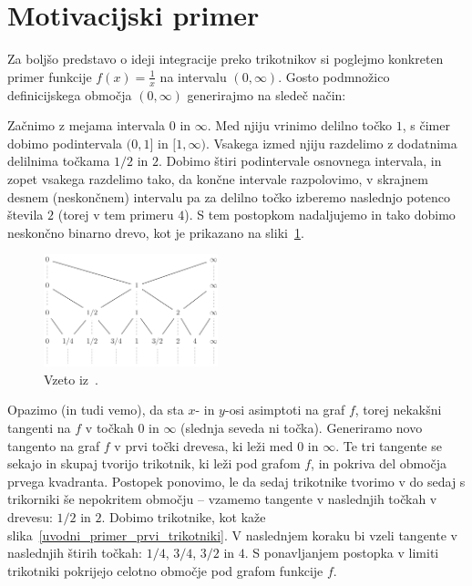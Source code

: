 \documentclass[a4paper, 12pt, titlepage]{article}
\begin{document}
\newpage
\section{Motivacijski primer}

Za boljšo predstavo o ideji integracije preko trikotnikov si poglejmo konkreten primer funkcije $ f(x) = \frac{1}{x} $ na intervalu $ (0, \infty) $. Gosto podmnožico definicijskega območja $ (0, \infty) $ generirajmo na sledeč način:

Začnimo z mejama intervala $ 0 $ in $ \infty $. Med njiju vrinimo delilno točko $ 1 $, s čimer dobimo podintervala $ (0, 1] $ in $ [1, \infty) $. Vsakega izmed njiju razdelimo z dodatnima delilnima točkama $ 1/2 $ in $ 2 $. Dobimo štiri podintervale osnovnega intervala, in zopet vsakega razdelimo tako, da končne intervale razpolovimo, v skrajnem desnem (neskončnem) intervalu pa za delilno točko izberemo naslednjo potenco števila $ 2 $ (torej v tem primeru $ 4 $). S tem postopkom nadaljujemo in tako dobimo neskončno binarno drevo, kot je prikazano na sliki~\ref{uvodni_primer_drevo}.

\begin{figure}[h]
    \centering
    \includegraphics[width=0.45\textwidth]{slike/uvodni_primer_drevo.png}
    \caption{Vzeto iz~\cite{osnovni_clanek}.}
    \label{uvodni_primer_drevo}
\end{figure}

Opazimo (in tudi vemo), da sta $ x $- in $ y $-osi asimptoti na graf $ f $, torej nekakšni tangenti na $ f $ v točkah $ 0 $ in $ \infty $ (slednja seveda ni točka). Generiramo novo tangento na graf $ f $ v prvi točki drevesa, ki leži med $ 0 $ in $ \infty $. Te tri tangente se sekajo in skupaj tvorijo trikotnik, ki leži pod grafom $ f $, in pokriva del območja prvega kvadranta. Postopek ponovimo, le da sedaj trikotnike tvorimo v do sedaj s trikorniki še nepokritem območju -- vzamemo tangente v naslednjih točkah v drevesu: $ 1/2 $ in $ 2 $. Dobimo trikotnike, kot kaže slika~\ref{uvodni_primer_prvi_trikotniki}. V naslednjem koraku bi vzeli tangente v naslednjih štirih točkah: $ 1/4 $, $ 3/4 $, $ 3/2 $ in $ 4 $. S ponavljanjem postopka v limiti trikotniki pokrijejo celotno območje pod grafom funkcije $ f $.
\end{document}
